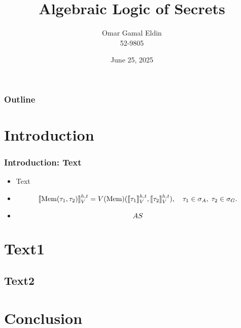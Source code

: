 \documentclass[aspectratio=169]{beamer}
\title{Algebraic Logic of Secrets}
\author{Omar Gamal Eldin \\52-9805}
\institute{Supervised by: \textbf{Prof. Haythem O. Ismail}}
\date{June 25, 2025}
\let\mathcal\relax
\let\mathfrak\relax
\begin{document}
\frame{\titlepage}


\begin{frame}
\frametitle{Outline}
\small
\tableofcontents
\end{frame}


\section{Introduction}

\begin{frame}
\frametitle{Introduction: Text}
\begin{itemize}
    \item Text
    \item {\thesisserif
      \[
        \llbracket \text{Mem}(\tau_1, \tau_2) \rrbracket_{\mathcal{V}}^{h,t}
        = \mathcal{V}(\text{Mem})
        (\llbracket \tau_1 \rrbracket_{\mathcal{V}}^{h,t}, 
        \llbracket \tau_2 \rrbracket_{\mathcal{V}}^{h,t}),
        \quad \tau_1 \in \sigma_A, \; \tau_2 \in \sigma_G.
      \]
    }
    \item \[\mathfrak{AS}\]
\end{itemize}
\end{frame}


\section{Text1}
\subsection{Text2}


\section{Conclusion}

\end{document}
